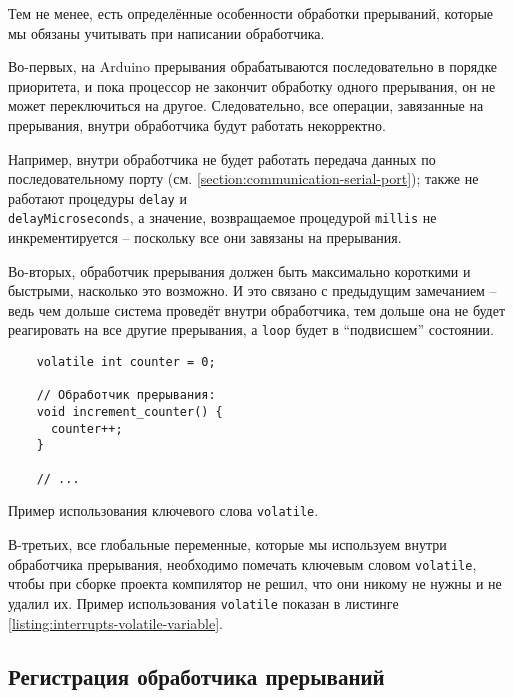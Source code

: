 \documentclass[../sparc.tex]{subfiles}
\begin{document}
Тем не менее, есть определённые особенности обработки прерываний, которые мы
обязаны учитывать при написании обработчика.

Во-первых, на Arduino прерывания обрабатываются последовательно в порядке
приоритета, и пока процессор не закончит обработку одного прерывания, он не
может переключиться на другое.  Следовательно, все операции, завязанные на
прерывания, внутри обработчика будут работать некорректно.

Например, внутри обработчика не будет работать передача данных по
последовательному порту (см. \ref{section:communication-serial-port}); также не
работают процедуры \texttt{delay} и\\
\texttt{delayMicroseconds}, а значение, возвращаемое процедурой
\texttt{millis} не инкрементируется -- поскольку все они завязаны на
прерывания.

Во-вторых, обработчик прерывания должен быть максимально короткими и быстрыми,
насколько это возможно.  И это связано с предыдущим замечанием -- ведь чем дольше
система проведёт внутри обработчика, тем дольше она не будет реагировать на все
другие прерывания, а \texttt{loop} будет в ``подвисшем'' состоянии.

\begin{listing}[H]
  \begin{verbatim}
    volatile int counter = 0;

    // Обработчик прерывания:
    void increment_counter() {
      counter++;
    }

    // ...
  \end{verbatim}
  \caption{Пример использования ключевого слова \texttt{volatile}.}
  \label{listing:interrupts-volatile-variable}
\end{listing}

 В-третьих, все
глобальные переменные, которые мы используем внутри обработчика прерывания,
необходимо помечать ключевым словом \texttt{volatile}, чтобы при сборке
проекта компилятор не решил, что они никому не нужны и не удалил их.  Пример
использования \texttt{volatile} показан в листинге
\ref{listing:interrupts-volatile-variable}.

\subsection{Регистрация обработчика прерываний}
\label{subsection:isr-registration}
\end{document}
